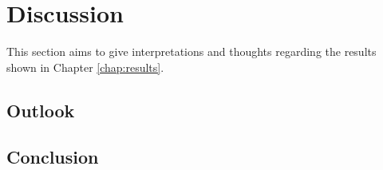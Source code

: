 \chapter{Discussion}
\label{chap:discussion}

This section aims to give interpretations and thoughts regarding the results shown in Chapter \ref{chap:results}.


\section{Outlook}
\label{sec:outlook}

\section{Conclusion}

